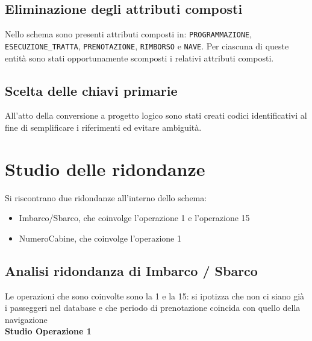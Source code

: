 \documentclass[a4paper, titlepage]{report}
\begin{document}
\subsection*{Eliminazione degli attributi composti}
Nello schema sono presenti attributi composti in: \texttt{PROGRAMMAZIONE}, \texttt{ESECUZIONE\_TRATTA}, \texttt{PRENOTAZIONE}, \texttt{RIMBORSO} e \texttt{NAVE}. Per ciascuna di queste entità sono stati opportunamente scomposti i relativi attributi composti.

\subsection*{Scelta delle chiavi primarie}
All'atto della conversione a progetto logico sono stati creati codici identificativi al fine di semplificare i riferimenti ed evitare ambiguità.

\newpage
\section*{Studio delle ridondanze}
\noindent
Si riscontrano due ridondanze all'interno dello schema:
\begin{itemize}
    \item Imbarco/Sbarco, che coinvolge l'operazione 1 e l'operazione 15
    \item NumeroCabine, che coinvolge l'operazione 1 
\end{itemize}
\subsection*{Analisi ridondanza di Imbarco / Sbarco}
Le operazioni che sono coinvolte sono la 1 e la 15: si ipotizza che non ci siano già i passeggeri nel database e che periodo di prenotazione coincida con quello della navigazione \\


\noindent
\textbf{\large{Studio Operazione 1}}\\
\end{document}
